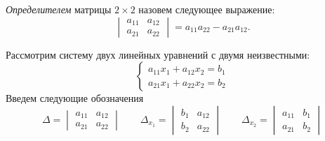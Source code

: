 \emph{Определителем} матрицы $2 \times 2$ назовем следующее выражение:
\[
\begin{vmatrix}
    a_{11} & a_{12}
\\
    a_{21} & a_{22}
\end{vmatrix}
=
    a_{11} a_{22} - a_{21} a_{12}
.\]

Рассмотрим систему двух линейных уравнений с двумя неизвестными:
\[
\left\{\begin{aligned}
    a_{11} x_1 + a_{12} x_2 = b_1
\\
    a_{21} x_1 + a_{22} x_2 = b_2
\end{aligned}\right.
\]
Введем следующие обозначения
\[
    \Delta
=
\begin{vmatrix}
    a_{11} & a_{12}
\\
    a_{21} & a_{22}
\end{vmatrix}
\qquad
    \Delta_{x_1}
=
\begin{vmatrix}
    b_1 & a_{12}
\\
    b_2 & a_{22}
\end{vmatrix}
\qquad
    \Delta_{x_2}
=
\begin{vmatrix}
    a_{11} & b_1
\\
    a_{21} & b_2
\end{vmatrix}
\]

